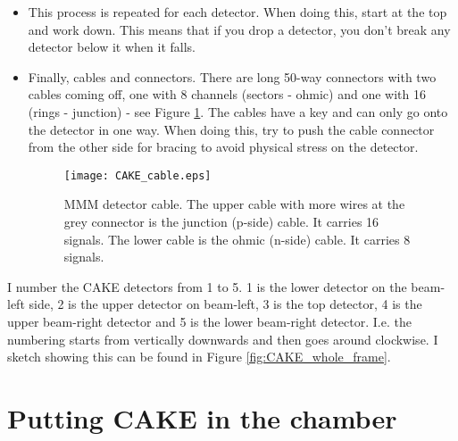 \documentclass[11pt]{report}
\begin{document}
\begin{itemize}
\item This process is repeated for each detector. When doing this, start at the top and work down. This means that if you drop a detector, you don’t break any detector below it when it falls.

\item Finally, cables and connectors. There are long 50-way connectors with two cables coming off, one with 8 channels (sectors - ohmic) and one with 16 (rings - junction) - see Figure \ref{fig:CAKE_cables}. The cables have a key and can only go onto the detector in one way. When doing this, try to push the cable connector from the other side for bracing to avoid physical stress on the detector.

\begin{figure}
 \texttt{[image: CAKE\_cable.eps]}
 \caption{MMM detector cable. The upper cable with more wires at the grey connector is the junction (p-side) cable. It carries 16 signals. The lower cable is the ohmic (n-side) cable. It carries 8 signals.}
 \label{fig:CAKE_cables}
\end{figure}


\end{itemize}

I number the CAKE detectors from 1 to 5. 1 is the lower detector on the beam-left side, 2 is the upper detector on beam-left, 3 is the top detector, 4 is the upper beam-right detector and 5 is the lower beam-right detector. I.e. the numbering starts from vertically downwards and then goes around clockwise. I sketch showing this can be found in Figure \ref{fig:CAKE_whole_frame}.


\section{Putting CAKE in the chamber}
\end{document}
